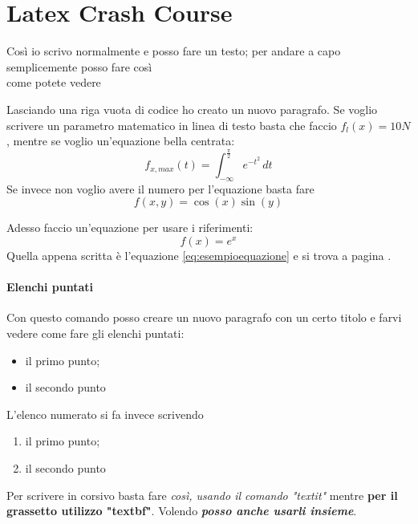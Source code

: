 \section{Latex Crash Course}
	Così io scrivo normalmente e posso fare un testo; per andare a capo semplicemente posso fare così \\ come potete vedere
	
	Lasciando una riga vuota di codice ho creato un nuovo paragrafo. Se voglio scrivere un parametro matematico in linea di testo basta che faccio $f_l(x) = 10N$, mentre se voglio un'equazione bella centrata:
	\begin{equation}
		f_{x, max} (t) = \int_{-\infty}^{\frac \pi 2} e^{-t^2} \, dt
	\end{equation}
	Se invece non voglio avere il numero per l'equazione basta fare 
	\[ f(x,y) = \cos(x) \sin(y) \]
	
	Adesso faccio un'equazione per usare i riferimenti:
	\begin{equation} \label{eq:esempioequazione}
		f(x) = e^x
	\end{equation}
	Quella appena scritta è l'equazione \ref{eq:esempioequazione} e si trova a pagina \pageref{eq:esempioequazione}.
	
	\paragraph{Elenchi puntati} Con questo comando posso creare un nuovo paragrafo con un certo titolo e farvi vedere come fare gli elenchi puntati:
	\begin{itemize}
		\item il primo punto;
		\item il secondo punto
	\end{itemize}
	L'elenco numerato si fa invece scrivendo
	\begin{enumerate}
		\item il primo punto;
		\item il secondo punto
	\end{enumerate}
	
	Per scrivere in corsivo basta fare \textit{così, usando il comando "textit"} mentre \textbf{per il grassetto utilizzo "textbf"}. Volendo \textbf{\textit{posso anche usarli insieme}}.




